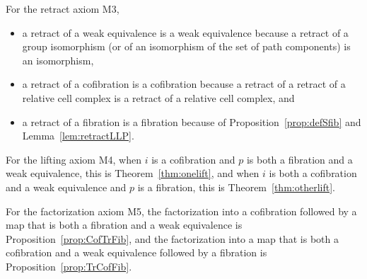 \documentclass[12pt]{amsart}
\numberwithin{equation}{section}
\theoremstyle{slplain}
\theoremstyle{definition}
\theoremstyle{remark}
\newcommand{\thmref}{Theorem~\ref}
\newcommand{\propref}{Proposition~\ref}
\newcommand{\lemref}{Lemma~\ref}
\begin{document}
For the retract axiom M3,
\begin{itemize}
\item a retract of a weak equivalence is a weak equivalence because a
  retract of a group isomorphism (or of an isomorphism of the set of
  path components) is an isomorphism,
\item a retract of a cofibration is a cofibration because a retract of
  a retract of a relative cell complex is a retract of a relative cell
  complex, and
\item a retract of a fibration is a fibration because of
  \propref{prop:defSfib} and \lemref{lem:retractLLP}.
\end{itemize}

For the lifting axiom M4, when $i$ is a cofibration and $p$ is both a
fibration and a weak equivalence, this is \thmref{thm:onelift}, and
when $i$ is both a cofibration and a weak equivalence and $p$ is a
fibration, this is \thmref{thm:otherlift}.

For the factorization axiom M5, the factorization into a cofibration
followed by a map that is both a fibration and a weak equivalence is
\propref{prop:CofTrFib}, and the factorization into a map that is both
a cofibration and a weak equivalence followed by a fibration is
\propref{prop:TrCofFib}.
\end{document}
